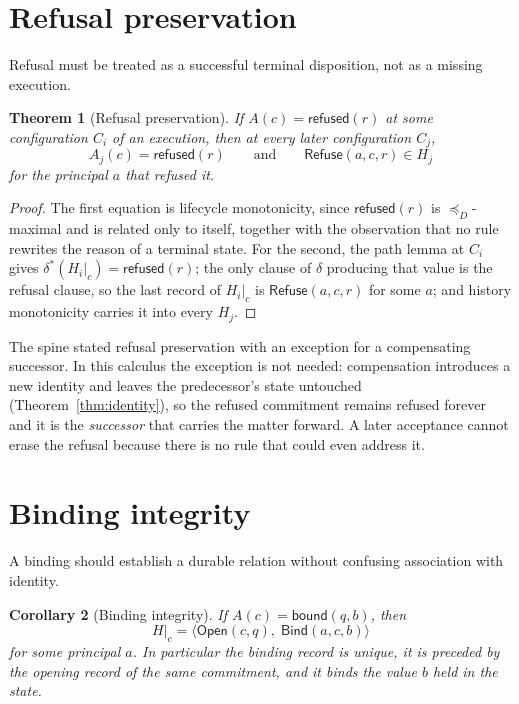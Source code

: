 \documentclass[11pt,openany]{book}
\newtheorem{theorem}{Theorem}[chapter]
\newtheorem{corollary}[theorem]{Corollary}
\theoremstyle{remark}
\newcommand{\Refuse}{\mathsf{Refuse}}
\newcommand{\Bind}{\mathsf{Bind}}
\begin{document}
\section{Refusal preservation}

Refusal must be treated as a successful terminal disposition, not as a
missing execution.

\begin{theorem}[Refusal preservation]\label{thm:refusal}
If $A(c)=\mathsf{refused}(r)$ at some configuration $C_i$ of an execution,
then at every later configuration $C_j$,
\[
A_j(c)=\mathsf{refused}(r)
\qquad\text{and}\qquad
\Refuse(a,c,r)\in H_j
\]
for the principal $a$ that refused it.
\end{theorem}

\begin{proof}
The first equation is lifecycle monotonicity, since
$\mathsf{refused}(r)$ is $\preceq_D$-maximal and is related only to
itself, together with the observation that no rule rewrites the reason of a
terminal state. For the second, the path lemma at $C_i$ gives
$\delta^{*}(H_i|_c)=\mathsf{refused}(r)$; the only clause of $\delta$
producing that value is the refusal clause, so the last record of $H_i|_c$
is $\Refuse(a,c,r)$ for some $a$; and history monotonicity carries it into
every $H_j$.
\end{proof}

The spine stated refusal preservation with an exception for a
compensating successor. In this calculus the exception is not needed:
compensation introduces a new identity and leaves the predecessor's state
untouched (Theorem~\ref{thm:identity}), so the refused commitment remains
refused forever and it is the \emph{successor} that carries the matter
forward. A later acceptance cannot erase the refusal because there is no
rule that could even address it.

\section{Binding integrity}

A binding should establish a durable relation without confusing
association with identity.

\begin{corollary}[Binding integrity]
If $A(c)=\mathsf{bound}(q,b)$, then
\[
H|_c=\langle \mathsf{Open}(c,q),\;\Bind(a,c,b)\rangle
\]
for some principal $a$. In particular the binding record is unique, it is
preceded by the opening record of the same commitment, and it binds the
value $b$ held in the state.
\end{corollary}
\end{document}
